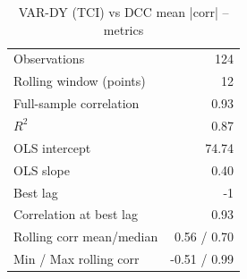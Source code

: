 \begin{table}[h]
\centering
\caption{VAR-DY (TCI) vs DCC mean |corr| -- metrics}
\begin{tabular}{l r}
\hline
Observations                  & 124 \\
Rolling window (points)       & 12 \\
Full-sample correlation       & 0.93 \\
$R^2$                         & 0.87 \\
OLS intercept                 & 74.74 \\
OLS slope                     & 0.40 \\
Best lag                      & -1 \\
Correlation at best lag       & 0.93 \\
Rolling corr mean/median      & 0.56 / 0.70 \\
Min / Max rolling corr        & -0.51 / 0.99 \\
\hline
\end{tabular}
\label{tab:dy_vs_dcc}
\end{table}